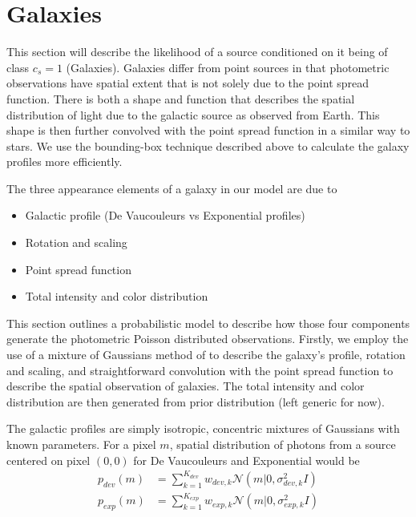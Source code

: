 \documentclass[11pt]{article}
\begin{document}
\section{Galaxies}
This section will describe the likelihood of a source conditioned on it being of class $c_s = 1$ (Galaxies).  Galaxies differ from point sources in that photometric observations have spatial extent that is not solely due to the point spread function.  There is both a shape and function that describes the spatial distribution of light due to the galactic source as observed from Earth.  This shape is then further convolved with the point spread function in a similar way to stars.  We use the
bounding-box technique described above to calculate the galaxy profiles more efficiently.

The three appearance elements of a galaxy in our model are due to 
\begin{itemize}
\item Galactic profile (De Vaucouleurs vs Exponential profiles)
\item Rotation and scaling 
\item Point spread function 
\item Total intensity and color distribution 
\end{itemize}

This section outlines a probabilistic model to describe how those four components generate the photometric Poisson distributed observations. Firstly, we employ the use of a mixture of Gaussians method of  to describe the galaxy's profile, rotation and scaling, and straightforward convolution with the point spread function to describe the spatial observation of galaxies.  The total intensity and color distribution are then generated from prior distribution (left generic for now).


The galactic profiles are simply isotropic, concentric mixtures of Gaussians with known parameters.  For a pixel $m$, spatial distribution of photons from a source centered on pixel $(0,0)$ for De Vaucouleurs and Exponential would be
\begin{align}
  p_{dev}(m) &= \sum_{k=1}^{K_{dev}} w_{dev, k} \mathcal{N}\left(m | 0, \sigma^2_{dev, k} I \right) \\
  p_{exp}(m) &= \sum_{k=1}^{K_{exp}} w_{exp, k} \mathcal{N}\left(m | 0, \sigma^2_{exp, k} I \right)
\end{align}
\end{document}
